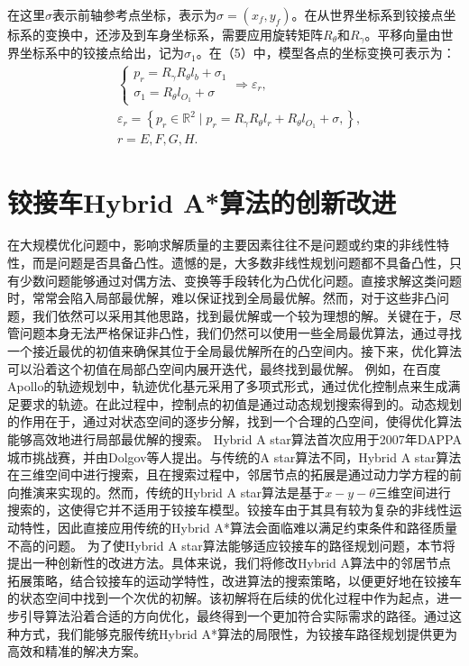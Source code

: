 \documentclass[master,academic]{ysuthesis} %
\begin{document}
	在这里$\sigma$表示前轴参考点坐标，表示为$\sigma=(x_f,y_f)$。在从世界坐标系到铰接点坐标系的变换中，还涉及到车身坐标系，需要应用旋转矩阵$R_\theta$和$R_\gamma$。平移向量由世界坐标系中的铰接点给出，记为$\sigma_1$。在（5）中，模型各点的坐标变换可表示为：
	\begin{equation}
		\begin{aligned}
			&\left\{\begin{matrix}
				p_r=R_\gamma R_\theta l_b+\sigma_1\\
				\sigma_1=R_\theta l_{O_1}+\sigma
			\end{matrix}\right.   \Longrightarrow \varepsilon_r ,\\
			&\varepsilon_r = \left\{ p_r \in \mathbb{R}^2 \mid p_r=R_\gamma R_\theta l_r+R_\theta l_{O_1}+\sigma,  \right\} ,\\
			&r = E,F,G,H.
		\end{aligned}
	\end{equation}
	
	\section{铰接车Hybrid A*算法的创新改进}
	在大规模优化问题中，影响求解质量的主要因素往往不是问题或约束的非线性特性，而是问题是否具备凸性。遗憾的是，大多数非线性规划问题都不具备凸性，只有少数问题能够通过对偶方法、变换等手段转化为凸优化问题。直接求解这类问题时，常常会陷入局部最优解，难以保证找到全局最优解。然而，对于这些非凸问题，我们依然可以采用其他思路，找到最优解或一个较为理想的解。关键在于，尽管问题本身无法严格保证非凸性，我们仍然可以使用一些全局最优算法，通过寻找一个接近最优的初值来确保其位于全局最优解所在的凸空间内。接下来，优化算法可以沿着这个初值在局部凸空间内展开迭代，最终找到最优解。
	例如，在百度Apollo的轨迹规划中，轨迹优化基元采用了多项式形式，通过优化控制点来生成满足要求的轨迹。在此过程中，控制点的初值是通过动态规划搜索得到的。动态规划的作用在于，通过对状态空间的逐步分解，找到一个合理的凸空间，使得优化算法能够高效地进行局部最优解的搜索。
	Hybrid A star算法首次应用于2007年DAPPA城市挑战赛，并由Dolgov等人提出。与传统的A star算法不同，Hybrid A star算法在三维空间中进行搜索，且在搜索过程中，邻居节点的拓展是通过动力学方程的前向推演来实现的。然而，传统的Hybrid A star算法是基于$x-y-\theta$三维空间进行搜索的，这使得它并不适用于铰接车模型。铰接车由于其具有较为复杂的非线性运动特性，因此直接应用传统的Hybrid A*算法会面临难以满足约束条件和路径质量不高的问题。
	为了使Hybrid A star算法能够适应铰接车的路径规划问题，本节将提出一种创新性的改进方法。具体来说，我们将修改Hybrid A算法中的邻居节点拓展策略，结合铰接车的运动学特性，改进算法的搜索策略，以便更好地在铰接车的状态空间中找到一个次优的初解。该初解将在后续的优化过程中作为起点，进一步引导算法沿着合适的方向优化，最终得到一个更加符合实际需求的路径。通过这种方式，我们能够克服传统Hybrid A*算法的局限性，为铰接车路径规划提供更为高效和精准的解决方案。
\end{document}
